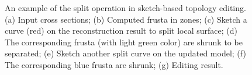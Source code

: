 \begin{figure} [htbp]
{\begin{minipage}[b]{0.22\textwidth}
    \end{minipage}}
  \caption{An example of the split operation in sketch-based topology editing.
  (a) Input cross sections;
  (b) Computed frusta in zones;
  (c) Sketch a curve (red) on the reconstruction result to split local surface;
  (d) The corresponding frusta (with light green color) are shrunk to be separated;
  (e) Sketch another split curve on the updated model;
  (f) The corresponding blue frusta are shrunk;
  (g) Editing result.}
  \label{fig:be}
\end{figure}

